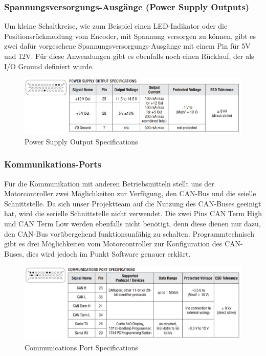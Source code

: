\subsubsection{Spannungsversorgungs-Ausgänge (Power Supply Outputs)}
Um kleine Schaltkreise, wie zum Beispiel einen LED-Indikator oder die Positionsrückmeldung vom Encoder, mit Spannung versorgen zu können, gibt es zwei dafür vorgesehene Spannungsversorgungs-Ausgänge mit einem Pin für 5V und 12V. Für diese Anwendungen gibt es ebenfalls noch einen Rücklauf, der als I/O Ground definiert wurde.

\begin{figure}[H]
	\begin{center}
		\includegraphics[scale=0.5]{figures/hcis/Power_Supply_Output_Specifications.png}
		\caption{Power Supply Output Specifications}
	\end{center}
\end{figure}


\subsubsection{Kommunikations-Ports}
Für die Kommunikation mit anderen Betriebsmitteln stellt uns der Motorcontroller zwei Möglichkeiten zur Verfügung, den CAN-Bus und die seielle Schnittstelle. Da sich unser Projektteam auf die Nutzung des CAN-Buses geeinigt hat, wird die serielle Schnittstelle nicht verwendet. Die zwei Pins CAN Term High und CAN Term Low werden ebenfalls nicht benötigt, denn diese dienen nur dazu, den CAN-Bus vorübergehend funktionsunfähig zu schalten. Programmtechnisch gibt es drei Möglichkeiten vom Motorcontroller zur Konfiguration des CAN-Buses, dies wird jedoch im Punkt Software genauer erklärt.

\begin{figure}[H]
	\begin{center}
		\includegraphics[scale=0.5]{figures/hcis/Communications_Port_Specifications.png}
		\caption{Communications Port Specifications}
	\end{center}
\end{figure}



